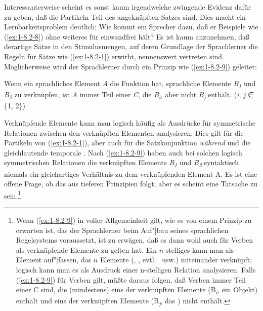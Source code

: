 \documentclass[output=paper]{langsci/langscibook}
\begin{document}
Interessanterweise scheint es sonst kaum irgendwelche zwingende Evidenz dafür
zu geben, daß die Partikeln Teil des angeknüpften Satzes sind. Dies macht ein Lernbarkeitsproblem deutlich: Wie kommt ein Sprecher dazu, daß er Beispiele wie (\ref{ex:1-8.2-8})
ohne weiteres für einwandfrei hält? Es ist kaum anzunehmen, daß derartige Sätze in
den Stimulusmengen, auf deren Grundlage der Sprachlerner die Regeln für Sätze
wie (\ref{ex:1-8.2-1}) erwirbt, nennenswert vertreten sind. Möglicherweise wird der Sprachlerner
durch ein Prinzip wie (\ref{ex:1-8.2-9}) geleitet:
\begin{exe}
\ex\label{ex:1-8.2-9}
Wenn ein sprachliches Element \textit{A} die Funktion hat, sprachliche Elemente
\textit{B\textsubscript{1}} und \textit{B\textsubscript{2}} zu verknüpfen, ist \textit{A} immer Teil einer  \textit{C}, die \textit{B\textsubscript{i}},
aber nicht \textit{B\textsubscript{j}} enthält. (\textit{i}, \textit{j} ∈ \{1, 2\})
\end{exe}
Verknüpfende Elemente kann man logisch häufig als Ausdrücke für symmetrische
Relationen zwischen den verknüpften Elementen analysieren. Dies gilt für die Partikeln von (\ref{ex:1-8.2-1}), aber auch für die Satzkonjunktion \textit{während} und die gleichlautende
temporale . Nach (\ref{ex:1-8.2-9}) haben auch bei solchen logisch symmetrischen Relationen die verknüpften Elemente \textit{B\textsubscript{1}} und \textit{B\textsubscript{2}} syntaktisch niemals ein gleichartiges
Verhältnis zu dem verknüpfenden Element A. Es ist eine offene Frage, ob das aus tieferen Prinzipien
folgt; aber es scheint eine Tatsache zu sein.\footnote{%
  Wenn (\ref{ex:1-8.2-9}) in voller Allgemeinheit gilt, wie es von einem Prinzip zu erwarten ist,
  das der Sprachlerner beim Auf"|bau seines sprachlichen Regelsystems voraussetzt, ist zu erwägen,
  daß es dann wohl auch für Verben als verknüpfende Elemente zu gelten hat. Ein $n$-stelliges 
  kann man als Element auf"|fassen, das $n$ Elemente (, ,
  evtl.\  usw.) miteinander verknüpft; logisch kann man es als Ausdruck
  einer n-stelligen Relation analysieren. Falls (\ref{ex:1-8.2-9}) für Verben gilt, müßte daraus
  folgen, daß Verben immer Teil einer  C sind, die (mindestens) eins der verknüpften
  Elemente (B\textsubscript{\textit{i}}, \zb ein Objekt) enthält und eins der verknüpften
  Elemente (B\textsubscript{\textit{j}}, \zb das ) nicht enthält.%
}
\end{document}
